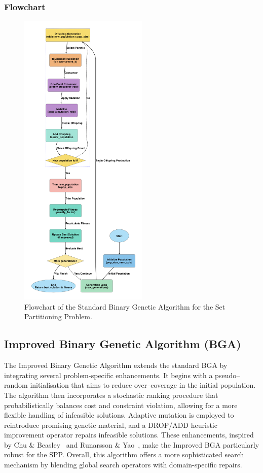 \documentclass[12pt]{article}
\begin{document}
\subsubsection{Flowchart}
\begin{figure}[htbp]
  \centering
  \includegraphics[width=0.55\textwidth]{standard_bga_flowchart.png}
  \caption{Flowchart of the Standard Binary Genetic Algorithm for the Set Partitioning Problem.}
  \label{fig:flowchart2}
\end{figure}

\newpage

\subsection{Improved Binary Genetic Algorithm (BGA)}
The Improved Binary Genetic Algorithm extends the standard BGA by integrating several problem-specific enhancements. It begins with a pseudo–random initialisation that aims to reduce over–coverage in the initial population. The algorithm then incorporates a stochastic ranking procedure that probabilistically balances cost and constraint violation, allowing for a more flexible handling of infeasible solutions. Adaptive mutation is employed to reintroduce promising genetic material, and a DROP/ADD heuristic improvement operator repairs infeasible solutions. These enhancements, inspired by Chu \& Beasley~\cite{ChuAndBeasley1998} and Runarsson \& Yao~\cite{RunarssonYao2000}, make the Improved BGA particularly robust for the SPP. Overall, this algorithm offers a more sophisticated search mechanism by blending global search operators with domain-specific repairs.
\end{document}
